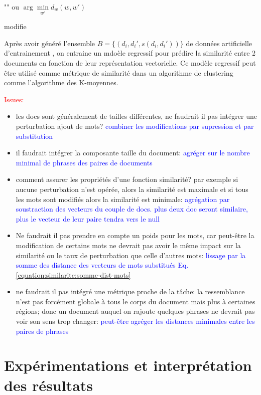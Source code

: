 \begin{algorithm}[H]
 \Return "" ou $\arg\min\limits_{w'} d_w(w, w')$\;
 \caption{modifie} \label{algo:similarite:modifiemot}
\end{algorithm}

Après avoir généré l'ensemble $B = \lbrace (d_i, d_i', s(d_i, d_i'))\rbrace$ de données artificielle d'entrainement , on entraine un mdoèle regressif pour prédire la similarité entre 2 documents en fonction de leur représentation vectorielle. Ce modèle regressif peut être utilisé comme métrique de similarité dans un algorithme de clustering comme l'algorithme des K-moyennes.

\textcolor{red}{Issues:}
\begin{itemize}
\item les docs sont généralement de tailles différentes, ne faudrait il pas intégrer une perturbation ajout de mots? \textcolor{blue}{combiner les modifications par supression et par substitution}
\item il faudrait intégrer la composante taille du document: \textcolor{blue}{agréger sur le nombre minimal de phrases des paires de documents}
\item comment assurer les propriétés d'une fonction similarité? par exemple si aucune perturbation n'est opérée, alors la similarité est maximale et si tous les mots sont modifiés alors la similarité est minimale: \textcolor{blue}{agrégation par soustraction des vecteurs du couple de docs. plus deux doc seront similaire, plus le vecteur de leur paire tendra vers le null}
\item Ne faudrait il pas prendre en compte un poids pour les mots, car peut-être la modification de certains mots ne devrait pas avoir le même impact sur la similarité ou le taux de perturbation que celle d'autres mots:  \textcolor{blue}{lissage par la somme des distance des vecteurs de mots substitués Eq. \ref{equation:similarite:somme-dist-mots}}
\item ne faudrait il pas intégré une métrique proche de la tâche: la ressemblance n'est pas forcément globale à tous le corps du document mais plus à certaines régions; donc un document auquel on rajoute quelques phrases ne devrait pas voir  son sens trop changer:  \textcolor{blue}{peut-être agréger les distances minimales entre les paires de phrases}
\end{itemize}

\section{Expérimentations et interprétation des résultats}
\label{sec:similarite:experimentations}
